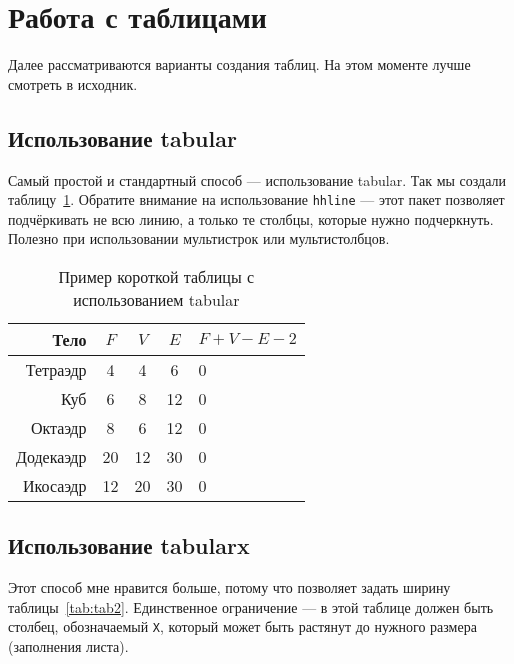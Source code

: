 \section{Работа с таблицами}

Далее рассматриваются варианты создания таблиц. 
На этом моменте лучше смотреть в исходник.

\lipsum[1]

\subsection{Использование tabular}

Самый простой и стандартный способ --- использование tabular. 
Так мы создали таблицу~\ref{tab:tab1}. 
Обратите внимание на использование \texttt{hhline} --- этот пакет 
позволяет подчёркивать не всю линию, а только те столбцы, которые 
нужно подчеркнуть. Полезно при использовании мультистрок или мультистолбцов.

\begin{table}    
    \caption{Пример короткой таблицы с использованием tabular}
    \begin{tabular}{|r|c|c|c|l|}\hline
    Тело      & $F$ & $V$  & $E$ & $F+V-E-2$ \\ \hline
    Тетраэдр  & 4   & 4    & 6   & 0         \\ \hhline{~-~-~}
    Куб       & 6   & 8    & 12  & 0         \\ \hhline{--~~~}
    Октаэдр   & 8   & 6    & 12  & 0         \\ \hhline{-----}
    Додекаэдр & 20  & 12   & 30  & 0         \\ \hline
    Икосаэдр  & 12  & 20   & 30  & 0         \\ \hline
    \end{tabular}
    \label{tab:tab1}
\end{table}

\lipsum[1]

\subsection{Использование tabularx}

Этот способ мне нравится больше, потому что позволяет задать ширину 
таблицы~\ref{tab:tab2}. Единственное ограничение --- в этой таблице должен 
быть столбец, обозначаемый \texttt{X}, который может быть растянут до 
нужного размера (заполнения листа).

